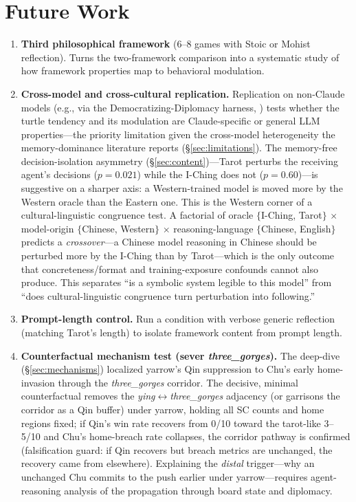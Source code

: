 \documentclass[11pt]{article}
\begin{document}
\section{Future Work}
\label{sec:future}

\begin{enumerate}
\item \textbf{Third philosophical framework} (6--8 games with Stoic or Mohist reflection). Turns the two-framework comparison into a systematic study of how framework properties map to behavioral modulation.
\item \textbf{Cross-model and cross-cultural replication.} Replication on non-Claude models (e.g., via the Democratizing-Diplomacy harness, \citealt{DemocratizingDiplomacy2025}) tests whether the turtle tendency and its modulation are Claude-specific or general LLM properties---the priority limitation given the cross-model heterogeneity the memory-dominance literature reports (\S\ref{sec:limitations}). The memory-free decision-isolation asymmetry (\S\ref{sec:content})---Tarot perturbs the receiving agent's decisions ($p = 0.021$) while the I-Ching does not ($p = 0.60$)---is suggestive on a sharper axis: a Western-trained model is moved more by the Western oracle than the Eastern one. This is the Western corner of a cultural-linguistic congruence test. A factorial of oracle $\{$I-Ching, Tarot$\}$ $\times$ model-origin $\{$Chinese, Western$\}$ $\times$ reasoning-language $\{$Chinese, English$\}$ predicts a \emph{crossover}---a Chinese model reasoning in Chinese should be perturbed more by the I-Ching than by Tarot---which is the only outcome that concreteness/format and training-exposure confounds cannot also produce. This separates ``is a symbolic system legible to this model'' from ``does cultural-linguistic congruence turn perturbation into following.''
\item \textbf{Prompt-length control.} Run a condition with verbose generic reflection (matching Tarot's length) to isolate framework content from prompt length.
\item \textbf{Counterfactual mechanism test (sever \emph{three\_gorges}).} The deep-dive (\S\ref{sec:mechanisms}) localized yarrow's Qin suppression to Chu's early home-invasion through the \emph{three\_gorges} corridor. The decisive, minimal counterfactual removes the \emph{ying}$\leftrightarrow$\emph{three\_gorges} adjacency (or garrisons the corridor as a Qin buffer) under yarrow, holding all SC counts and home regions fixed; if Qin's win rate recovers from 0/10 toward the tarot-like 3--5/10 and Chu's home-breach rate collapses, the corridor pathway is confirmed (falsification guard: if Qin recovers but breach metrics are unchanged, the recovery came from elsewhere). Explaining the \emph{distal} trigger---why an unchanged Chu commits to the push earlier under yarrow---requires agent-reasoning analysis of the propagation through board state and diplomacy.

\end{enumerate}
\end{document}

